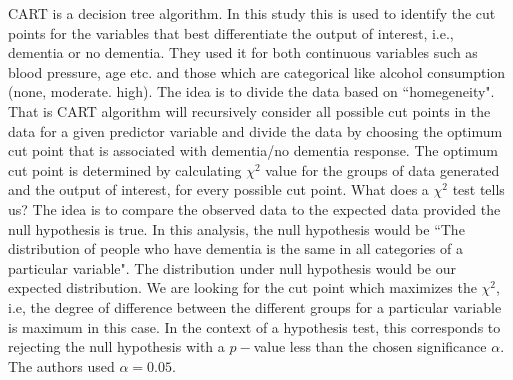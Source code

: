 \documentclass[12pt,letterpaper]{article}
\begin{document}
CART is a decision tree algorithm. In this study this is used to identify the cut points for the variables that best differentiate the output of interest, i.e., dementia or no dementia. They used it for both continuous variables such as blood pressure, age etc. and those which are categorical like alcohol consumption (none, moderate. high). The idea is to divide the data based on ``homegeneity". That is CART algorithm will recursively consider all possible cut points in the data for a given predictor variable and divide the data by choosing the optimum cut point that is associated with dementia/no dementia response. The optimum cut point is determined by calculating $\chi^2$ value for the groups of data generated and the output of interest, for every possible cut point. What does a $\chi^2$ test tells us? The idea is to compare the observed data to the expected data provided the null hypothesis is true. In this analysis, the null hypothesis would be ``The distribution of people who have dementia is the same in all categories of a particular variable". The distribution under null hypothesis would be our expected distribution. We are looking for the cut point which maximizes the $\chi^2$, i.e, the degree of difference between the different groups for a particular variable is maximum in this case. In the context of a  hypothesis test, this corresponds to rejecting the null hypothesis with a $p-$value less than the chosen significance $\alpha$. The authors used $\alpha=0.05$. \\
\end{document}
